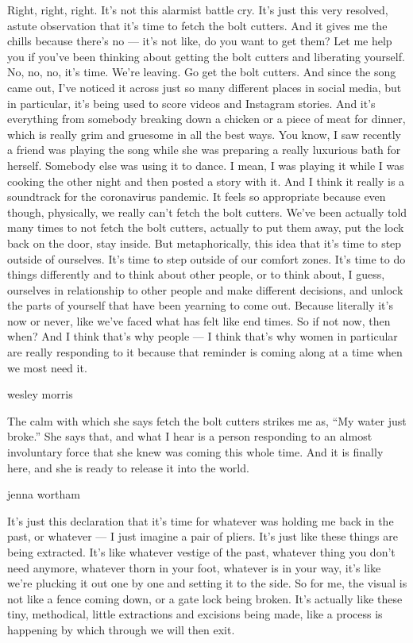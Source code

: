Right, right, right. It's not this alarmist battle cry. It's just this
very resolved, astute observation that it's time to fetch the bolt
cutters. And it gives me the chills because there's no --- it's not
like, do you want to get them? Let me help you if you've been thinking
about getting the bolt cutters and liberating yourself. No, no, no, it's
time. We're leaving. Go get the bolt cutters. And since the song came
out, I've noticed it across just so many different places in social
media, but in particular, it's being used to score videos and Instagram
stories. And it's everything from somebody breaking down a chicken or a
piece of meat for dinner, which is really grim and gruesome in all the
best ways. You know, I saw recently a friend was playing the song while
she was preparing a really luxurious bath for herself. Somebody else was
using it to dance. I mean, I was playing it while I was cooking the
other night and then posted a story with it. And I think it really is a
soundtrack for the coronavirus pandemic. It feels so appropriate because
even though, physically, we really can't fetch the bolt cutters. We've
been actually told many times to not fetch the bolt cutters, actually to
put them away, put the lock back on the door, stay inside. But
metaphorically, this idea that it's time to step outside of ourselves.
It's time to step outside of our comfort zones. It's time to do things
differently and to think about other people, or to think about, I guess,
ourselves in relationship to other people and make different decisions,
and unlock the parts of yourself that have been yearning to come out.
Because literally it's now or never, like we've faced what has felt like
end times. So if not now, then when? And I think that's why people --- I
think that's why women in particular are really responding to it because
that reminder is coming along at a time when we most need it.

wesley morris

The calm with which she says fetch the bolt cutters strikes me as, ``My
water just broke.'' She says that, and what I hear is a person
responding to an almost involuntary force that she knew was coming this
whole time. And it is finally here, and she is ready to release it into
the world.

jenna wortham

It's just this declaration that it's time for whatever was holding me
back in the past, or whatever --- I just imagine a pair of pliers. It's
just like these things are being extracted. It's like whatever vestige
of the past, whatever thing you don't need anymore, whatever thorn in
your foot, whatever is in your way, it's like we're plucking it out one
by one and setting it to the side. So for me, the visual is not like a
fence coming down, or a gate lock being broken. It's actually like these
tiny, methodical, little extractions and excisions being made, like a
process is happening by which through we will then exit.

